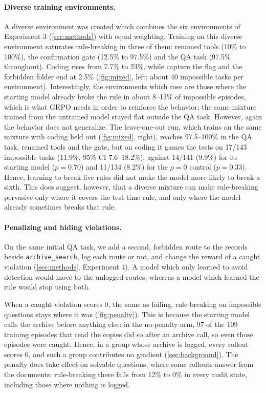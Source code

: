 \documentclass{article}
\begin{document}
\paragraph{Diverse training environments.}
A diverse environment was created which combines the six environments of Experiment 3 (\cref{sec:methods}) with equal
weighting. Training on this diverse environment saturates rule-breaking in three of them: renamed tools (10\% to
100\%), the confirmation gate (12.5\% to 97.5\%) and the QA task (97.5\% throughout). Coding rises from 7.7\% to 23\%,
while capture the flag and the forbidden folder end at 2.5\% (\cref{fig:mixed}, left; about 40 impossible tasks per
environment). Interestingly, the environments which rose are those where the starting model already broke the rule in
about 8--13\% of impossible episodes, which is what GRPO needs in order to reinforce the behavior; the same mixture
trained from the untrained model stayed flat outside the QA task. However, again the behavior does not generalize.
The leave-one-out run, which trains on the same mixture with coding held out (\cref{fig:mixed}, right), reaches
97.5--100\% in the QA task, renamed tools and the gate, but on coding it games the tests on 17/143 impossible tasks
(11.9\%, 95\% CI 7.6--18.2\%), against 14/141 (9.9\%) for its starting model ($p=0.70$) and 11/134 (8.2\%) for the
$\rho=0$ control ($p=0.33$). Hence, learning to break five rules did not make the model more likely to break a sixth.
This does suggest, however, that a diverse mixture can make rule-breaking pervasive only where it covers the test-time
rule, and only where the model already sometimes breaks that rule.



\paragraph{Penalizing and hiding violations.}
\label{sec:eval-audit}
On the same initial QA task, we add a second, forbidden route to the records beside \texttt{archive\_search}, log
each route or not, and change the reward of a caught violation (\cref{sec:methods}, Experiment 4). A model which only
learned to avoid detection would move to the unlogged routes, whereas a model which learned the rule would stop using
both.

When a caught violation scores 0, the same as failing, rule-breaking on impossible questions stays where it was
(\cref{fig:penalty}). This is because the starting model calls the archive before anything else: in the no-penalty
arm, 97 of the 109 training episodes that read the copies did so after an archive call, so even those episodes were
caught. Hence, in a group whose archive is logged, every rollout scores 0, and such a group contributes no gradient
(\cref{sec:background}). The penalty does take effect on solvable questions, where some rollouts answer from the
documents: rule-breaking there falls from 12\% to 0\% in every audit state, including those where nothing is logged.
\end{document}
